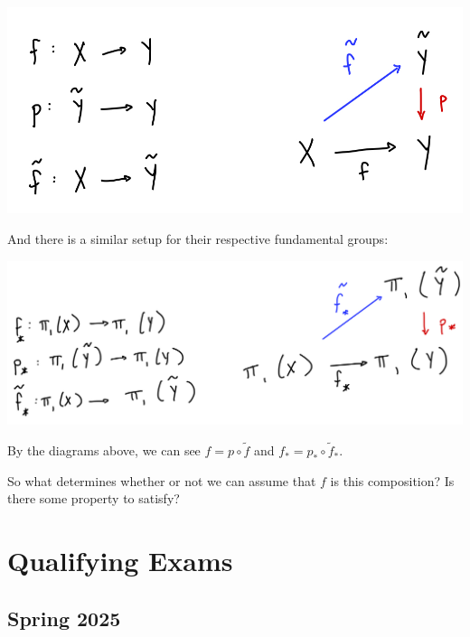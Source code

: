 \documentclass[12pt]{article}
\begin{document}
\par \begin{center} \includegraphics[scale=.2]{pics/liftcomposition} \end{center} 

And there is a similar setup for their respective fundamental groups:

\par \begin{center} \includegraphics[scale=.2]{pics/inducedliftcomposition} \end{center} 

\begin{fact}
  By the diagrams above, we can see $f = p \circ \tilde{f}$ and $f_* = p_* \circ \tilde{f}_*$.
\end{fact}

\begin{uq}
  So what determines whether or not we can assume that $f$ is this composition? Is there some property to satisfy?
\end{uq}

\newpage

\section*{Qualifying Exams}

\subsection*{Spring 2025}
\end{document}

